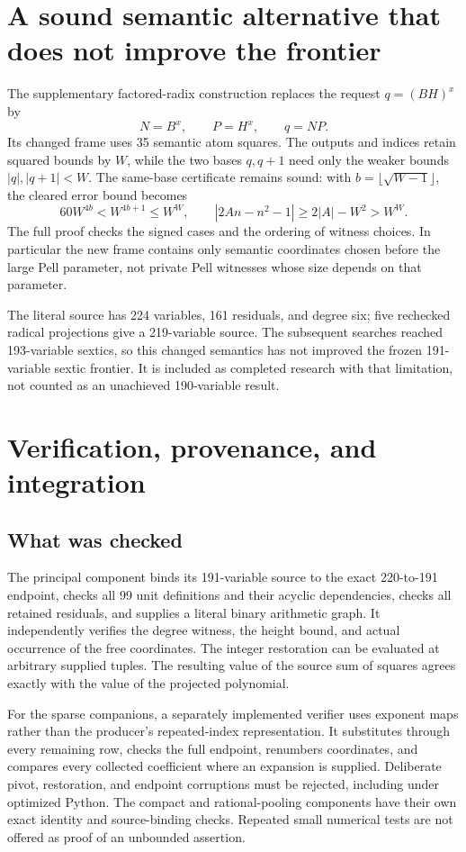 \documentclass[11pt]{article}
\begin{document}
\section{A sound semantic alternative that does not improve the frontier}

The supplementary factored-radix construction replaces the request
$q=(BH)^x$ by
\[
                  N=B^x,\qquad P=H^x,\qquad q=NP.
\]
Its changed frame uses 35 semantic atom squares. The outputs and indices
retain squared bounds by $W$, while the two bases $q,q+1$ need only the
weaker bounds $|q|,|q+1|<W$. The same-base certificate remains sound:
with $b=\lfloor\sqrt{W-1}\rfloor$, the cleared error bound becomes
\[
 60W^{4b}<W^{4b+1}\le W^W,
 \qquad |2An-n^2-1|\ge2|A|-W^2>W^W.
\]
The full proof checks the signed cases and the ordering of witness choices.
In particular the new frame contains only semantic coordinates chosen
before the large Pell parameter, not private Pell witnesses whose size
depends on that parameter.

The literal source has 224 variables, 161 residuals, and degree six;
five rechecked radical projections give a 219-variable source. The
subsequent searches reached 193-variable sextics, so this changed
semantics has not improved the frozen 191-variable sextic frontier.
It is included as completed research with that limitation, not counted
as an unachieved 190-variable result.

\section{Verification, provenance, and integration}\label{sec:verification}

\subsection{What was checked}

The principal component binds its 191-variable source to the exact
220-to-191 endpoint, checks all 99 unit definitions and their acyclic
dependencies, checks all retained residuals, and supplies a literal
binary arithmetic graph. It independently verifies the degree witness,
the height bound, and actual occurrence of the free coordinates.
The integer restoration can be evaluated at arbitrary supplied tuples.
The resulting value of the source sum of squares agrees exactly with
the value of the projected polynomial.

For the sparse companions, a separately implemented verifier uses
exponent maps rather than the producer's repeated-index representation.
It substitutes through every remaining row, checks the full endpoint,
renumbers coordinates, and compares every collected coefficient where
an expansion is supplied. Deliberate pivot, restoration, and endpoint
corruptions must be rejected, including under optimized Python.
The compact and rational-pooling components have their own exact
identity and source-binding checks. Repeated small numerical tests
are not offered as proof of an unbounded assertion.
\end{document}
